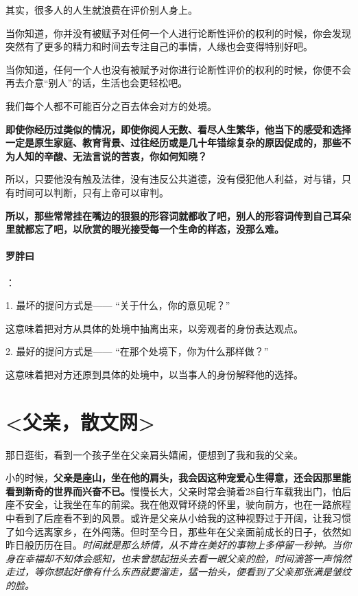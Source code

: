 \documentclass[UTF8,a4paper,8pt]{ctexart}
\begin{document}
 其实，很多人的人生就浪费在评价别人身上。
 
 当你知道，你并没有被赋予对任何一个人进行论断性评价的权利的时候，你会发现突然有了更多的精力和时间去专注自己的事情，人缘也会变得特别好吧。
 
 当你知道，任何一个人也没有被赋予对你进行论断性评价的权利的时候，你便不会再去介意“别人”的话，生活也会更轻松吧。
 
 我们每个人都不可能百分之百去体会对方的处境。
 
 \textbf{即使你经历过类似的情况，即使你阅人无数、看尽人生繁华，他当下的感受和选择一定是原生家庭、教育背景、过往经历或是几十年错综复杂的原因促成的，那些不为人知的辛酸、无法言说的苦衷，你如何知晓？}
 
 所以，只要他没有触及法律，没有违反公共道德，没有侵犯他人利益，对与错，只有时间可以判断，只有上帝可以审判。
 
 \textbf{所以，那些常常挂在嘴边的狠狠的形容词就都收了吧，别人的形容词传到自己耳朵里就都忘了吧，以欣赏的眼光接受每一个生命的样态，没那么难。}
 
 
 \paragraph{罗胖曰}：
 
 1. 最坏的提问方式是——
 “关于什么，你的意见呢？”
 
 这意味着把对方从具体的处境中抽离出来，以旁观者的身份表达观点。
 
 2. 最好的提问方式是——
 “在那个处境下，你为什么那样做？”
 
 这意味着把对方还原到具体的处境中，以当事人的身份解释他的选择。
 
 \newpage
 \section{<父亲，散文网>}
 那日逛街，看到一个孩子坐在父亲肩头嬉闹，便想到了我和我的父亲。
 
 小的时候，\textbf{父亲是座山，坐在他的肩头，我会因这种宠爱心生得意，还会因那里能看到新奇的世界而兴奋不已。}慢慢长大，父亲时常会骑着28自行车载我出门，怕后座不安全，让我坐在车的前梁。我在他双臂环绕的怀里，驶向前方，也在一路旅程中看到了后座看不到的风景。或许是父亲从小给我的这种视野过于开阔，让我习惯了如今远离家乡，在外闯荡。但时至今日，那些年在父亲面前成长的日子，依然如昨日般历历在目。\textit{时间就是那么矫情，从不肯在美好的事物上多停留一秒钟。当你身在幸福却不知体会感知，也未曾想起扭头去看一眼父亲的脸，时间滴答一声悄然走过，等你想起好像有什么东西就要溜走，猛一抬头，便看到了父亲那张满是皱纹的脸。}
 
\end{document}
